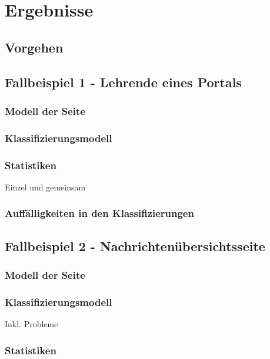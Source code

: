 \chapter{Ergebnisse}
    \label{chapter:Findings}
    \section{Vorgehen}
    \section{Fallbeispiel 1 - Lehrende eines Portals}
        \subsection{Modell der Seite}
        \subsection{Klassifizierungsmodell}
        \subsection{Statistiken}
            Einzel und gemeinsam
        \subsection{Auffälligkeiten in den Klassifizierungen}

    \section{Fallbeispiel 2 - Nachrichtenübersichtsseite}
        \subsection{Modell der Seite}
        \subsection{Klassifizierungsmodell}
            Inkl. Probleme
        \subsection{Statistiken}


